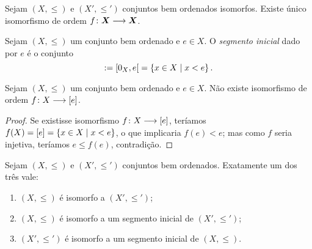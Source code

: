 \begin{exercise}
	Sejam $(X,\leq)$ e $(X',\leq')$ conjuntos bem ordenados isomorfos. Existe único isomorfismo de ordem ${f}\colon {\bm X} \longrightarrow {\bm X}$.
\end{exercise}

\begin{definition}
	Sejam $(X,\leq)$ um conjunto bem ordenado e $e \in X$. O \emph{segmento inicial} dado por $e$ é o conjunto
		\begin{equation*}
			[e] := \intfa{0_X}{e} = \set{x \in X}{x<e}.
		\end{equation*}
\end{definition}

\begin{proposition}
	Sejam $(X,\leq)$ um conjunto bem ordenado e $e \in X$. Não existe isomorfismo de ordem ${f}\colon {X} \longrightarrow {[e]}$.
\end{proposition}
\begin{proof}
	Se existisse isomorfismo ${f}\colon {X} \longrightarrow {[e]}$, teríamos $f(X) = [e] = \left\{{x \in X}\;\middle\vert\;{x<e}\right\}$, o que implicaria $f(e) < e$; mas como $f$ seria injetiva, teríamos $e \leq f(e)$, contradição.
\end{proof}

\begin{exercise}[Tricotomia]
	Sejam $(X,\leq)$ e $(X',\leq')$ conjuntos bem ordenados. Exatamente um dos três vale:
	\begin{enumerate}
		\item $(X,\leq)$ é isomorfo a $(X',\leq')$;
		\item $(X,\leq)$ é isomorfo a um segmento inicial de $(X',\leq')$;
		\item $(X',\leq')$ é isomorfo a um segmento inicial de $(X,\leq)$.
	\end{enumerate}
\end{exercise}
\begin{comment}

\begin{proof}
	Definamos a relação
		\begin{equation*}
			f := \set{(x,x') \in X \times X'}{[x] \simeq [x']'}.
		\end{equation*}
	Mostremos que $f$ é uma função injetiva. 
	\begin{enumerate}
		\item (Funtorialidade) Sejam $x_0,x_1 \in X$ e $x' \in X'$ tais que $[x_0] \simeq [x']'$ e $[x_1] \simeq [x']'$. Então $[x_0] \simeq [x_1]$ e, como $x_0 \leq x_1$ ou $x_1 \leq x_0$, e não existe isomorfismo de um conjunto bem ordenado com um segmento inicial, segue que $x_0 = x_1$.

		\item (Injetividade) Argumento análogo mostra que $f$ é injetiva.
	\end{enumerate}
\end{proof}

\end{comment}


